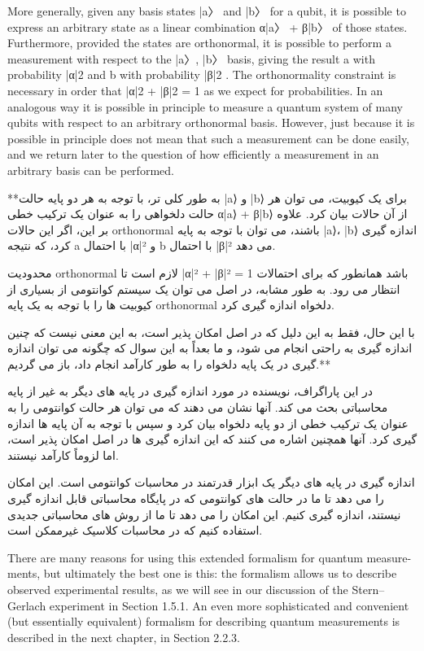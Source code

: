 \documentclass{book}
\begin{document}
More generally, given any basis states |a〉 and |b〉 for a qubit, it is possible to express an
arbitrary state as a linear combination α|a〉 + β|b〉 of those states. Furthermore, provided
the states are orthonormal, it is possible to perform a measurement with respect to
the |a〉, |b〉 basis, giving the result a with probability |α|2 and b with probability |β|2 .
The orthonormality constraint is necessary in order that |α|2 + |β|2 = 1 as we expect for
probabilities. In an analogous way it is possible in principle to measure a quantum system
of many qubits with respect to an arbitrary orthonormal basis. However, just because it
is possible in principle does not mean that such a measurement can be done easily, and
we return later to the question of how efficiently a measurement in an arbitrary basis can
be performed.


**به طور کلی تر، با توجه به هر دو پایه حالت |a⟩ و |b⟩ برای یک کیوبیت، می توان هر حالت دلخواهی را به عنوان یک ترکیب خطی α|a⟩ + β|b⟩ از آن حالات بیان کرد. علاوه بر این، اگر این حالات  orthonormal باشند، می توان با توجه به پایه |a⟩، |b⟩ اندازه گیری کرد، که نتیجه a با احتمال |α|² و b با احتمال |β|² می دهد.

محدودیت orthonormal لازم است تا |α|² + |β|² = 1 باشد همانطور که برای احتمالات انتظار می رود. به طور مشابه، در اصل می توان یک سیستم کوانتومی از بسیاری از کیوبیت ها را با توجه به یک پایه orthonormal دلخواه اندازه گیری کرد.

با این حال، فقط به این دلیل که در اصل امکان پذیر است، به این معنی نیست که چنین اندازه گیری به راحتی انجام می شود، و ما بعداً به این سوال که چگونه می توان اندازه گیری در یک پایه دلخواه را به طور کارآمد انجام داد، باز می گردیم.**

در این پاراگراف، نویسنده در مورد اندازه گیری در پایه های دیگر به غیر از پایه محاسباتی بحث می کند. آنها نشان می دهند که می توان هر حالت کوانتومی را به عنوان یک ترکیب خطی از دو پایه دلخواه بیان کرد و سپس با توجه به آن پایه ها اندازه گیری کرد. آنها همچنین اشاره می کنند که این اندازه گیری ها در اصل امکان پذیر است، اما لزوماً کارآمد نیستند.

اندازه گیری در پایه های دیگر یک ابزار قدرتمند در محاسبات کوانتومی است. این امکان را می دهد تا ما در حالت های کوانتومی که در پایگاه محاسباتی قابل اندازه گیری نیستند، اندازه گیری کنیم. این امکان را می دهد تا ما از روش های محاسباتی جدیدی استفاده کنیم که در محاسبات کلاسیک غیرممکن است.


There are many reasons for using this extended formalism for quantum measure-
ments, but ultimately the best one is this: the formalism allows us to describe observed
experimental results, as we will see in our discussion of the Stern–Gerlach experiment
in Section 1.5.1. An even more sophisticated and convenient (but essentially equivalent)
formalism for describing quantum measurements is described in the next chapter, in
Section 2.2.3.
\end{document}
